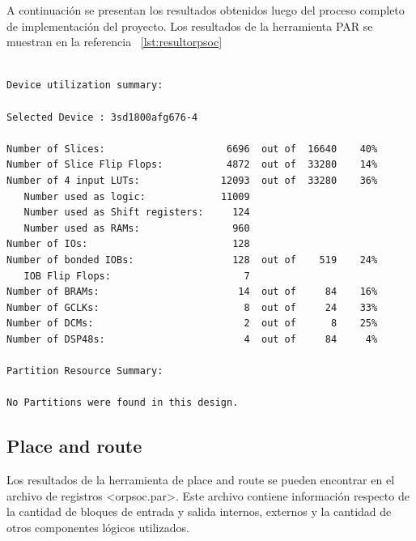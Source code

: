 	A continuación se presentan los resultados obtenidos luego del proceso completo de implementación del proyecto.  Los resultados de la herramienta PAR
	se muestran en la referencia ~\ref{lst:resultorpsoc}
		
\begin{lstlisting}[frame=single,caption={Resumen de utilización - ORPSoC},label={lst:resultorpsoc},breaklines]

Device utilization summary:

Selected Device : 3sd1800afg676-4 

Number of Slices:                     6696  out of  16640    40%  
Number of Slice Flip Flops:           4872  out of  33280    14%  
Number of 4 input LUTs:              12093  out of  33280    36%  
   Number used as logic:             11009
   Number used as Shift registers:     124
   Number used as RAMs:                960
Number of IOs:                         128
Number of bonded IOBs:                 128  out of    519    24%  
   IOB Flip Flops:                       7
Number of BRAMs:                        14  out of     84    16%  
Number of GCLKs:                         8  out of     24    33%  
Number of DCMs:                          2  out of      8    25%  
Number of DSP48s:                        4  out of     84     4%  

Partition Resource Summary:

No Partitions were found in this design.
\end{lstlisting}	
		
		\subsection{Place and route}	
		
		Los resultados de la herramienta de place and route se pueden encontrar en el archivo de registros <orpsoc.par>. Este archivo contiene información
		respecto de la cantidad de bloques de entrada y salida internos, externos y la cantidad de otros componentes lógicos utilizados. 
		

